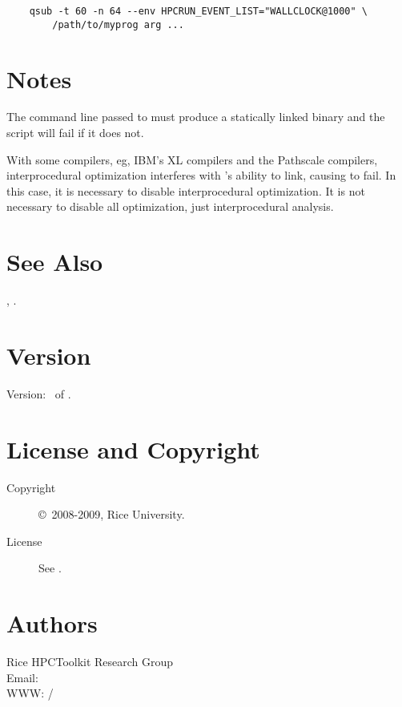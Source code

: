 \documentclass[english]{article}
\begin{document}
\begin{verbatim}
    qsub -t 60 -n 64 --env HPCRUN_EVENT_LIST="WALLCLOCK@1000" \
        /path/to/myprog arg ...
\end{verbatim}


\section{Notes}

The command line passed to  must produce a statically
linked binary and the \Prog{hpclink} script will fail if it does not.

With some compilers, eg, IBM's XL compilers and the Pathscale
compilers, interprocedural optimization interferes with
's ability to link, causing \Prog{hpclink} to fail.  In
this case, it is necessary to disable interprocedural optimization.
It is not necessary to disable all optimization, just interprocedural
analysis.


\section{See Also}

,
.

\section{Version}

Version: \Version\ of \Date.

\section{License and Copyright}

\begin{description}
\item[Copyright] \copyright\ 2008-2009, Rice University.
\item[License] See .
\end{description}

\section{Authors}

\noindent
Rice HPCToolkit Research Group \\
Email:  \\
WWW: /

\LatexManEnd
\end{document}
